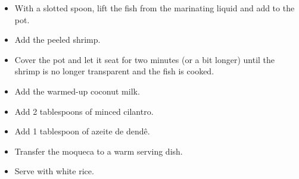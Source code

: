 \documentclass[11pt,letterpaper]{article}
\begin{document}
\begin{description}
\begin{enumerate}
\begin{itemize}
	\item With a slotted spoon, lift the fish from the marinating liquid and add to the pot.
	\item Add the peeled shrimp.
	\item Cover the pot and let it seat for two minutes (or a bit longer) until the shrimp is no longer transparent and the fish is cooked.
	\item Add the warmed-up coconut milk.
	\item Add 2 tablespoons of minced cilantro.
	\item Add 1 tablespoon of azeite de dend\^e.
	\item Transfer the moqueca to a warm serving dish.
	\item Serve with white rice.
	\end{itemize}
	\end{enumerate}
\end{description}
\end{document}
